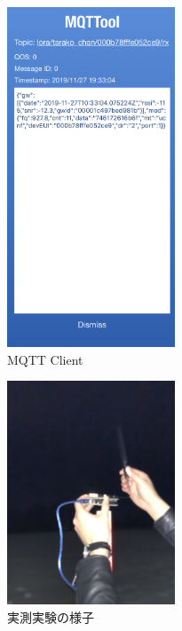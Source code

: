 \begin{figure}[]
    \begin{center}
    \includegraphics[width=5cm]{figures/mqtt.PNG}
    \caption{MQTT Client}
    \label{fig:mqtt}
    \end{center}
\end{figure}

\begin{figure}[]
    \begin{center}
    \includegraphics[width=5cm]{figures/experiment.jpg}
    \caption{実測実験の様子}
    \label{fig:experiment}
    \end{center}
\end{figure}